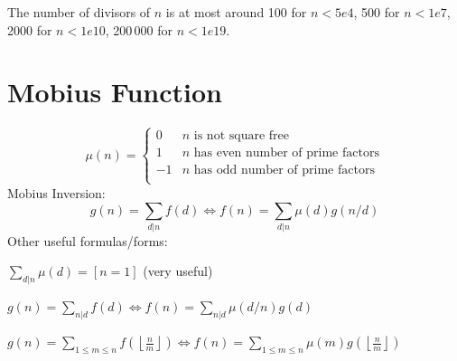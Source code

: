 	The number of divisors of $n$ is at most around 100 for $n < 5e4$, 500 for $n < 1e7$, 2000 for $n < 1e10$, 200\,000 for $n < 1e19$.

\section{Mobius Function}
\[
	\mu(n) = \begin{cases} 0 & n \textrm{ is not square free}\\ 1 & n \textrm{ has even number of prime factors}\\ -1 & n \textrm{ has odd number of prime factors}\\\end{cases}
\]
  Mobius Inversion:
  \[ g(n) = \sum_{d|n} f(d) \Leftrightarrow f(n) = \sum_{d|n} \mu(d)g(n/d) \]
  Other useful formulas/forms:

  $ \sum_{d | n} \mu(d) = [ n = 1] $ (very useful)

  $ g(n) = \sum_{n|d} f(d) \Leftrightarrow f(n) = \sum_{n|d} \mu(d/n)g(d)$

 $ g(n) = \sum_{1 \leq m \leq n} f(\left\lfloor\frac{n}{m}\right \rfloor ) \Leftrightarrow f(n) = \sum_{1\leq m\leq n} \mu(m)g(\left\lfloor\frac{n}{m}\right\rfloor)$
